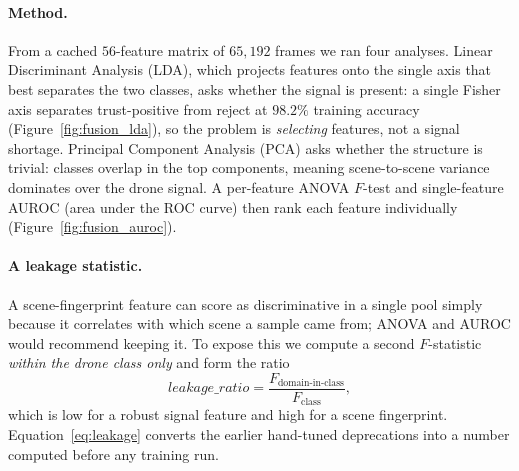 \paragraph{Method.}
From a cached $56$-feature matrix of $65{,}192$ frames we ran four analyses. Linear Discriminant Analysis (LDA), which projects features onto the single axis that best separates the two classes, asks whether the signal is present: a single Fisher axis separates trust-positive from reject at $98.2\%$ training accuracy (Figure~\ref{fig:fusion_lda}), so the problem is \emph{selecting} features, not a signal shortage. Principal Component Analysis (PCA) asks whether the structure is trivial: classes overlap in the top components, meaning scene-to-scene variance dominates over the drone signal. A per-feature ANOVA $F$-test and single-feature AUROC (area under the ROC curve) then rank each feature individually (Figure~\ref{fig:fusion_auroc}).

\paragraph{A leakage statistic.}
A scene-fingerprint feature can score as discriminative in a single pool simply because it correlates with which scene a sample came from; ANOVA and AUROC would recommend keeping it. To expose this we compute a second $F$-statistic \emph{within the drone class only} and form the ratio
\begin{equation}
\mathit{leakage\_ratio} = \frac{F_\text{domain-in-class}}{F_\text{class}},
\label{eq:leakage}
\end{equation}
which is low for a robust signal feature and high for a scene fingerprint. Equation~\ref{eq:leakage} converts the earlier hand-tuned deprecations into a number computed before any training run.

